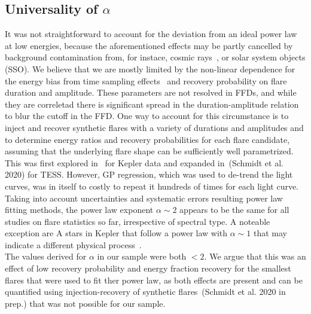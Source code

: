 \documentclass{aa}
\begin{document}
\subsection{Universality of $\alpha$}
It was not straightforward to account for the deviation from an ideal power law at low energies, because the aforementioned effects may be partly cancelled by background contamination from, for instace, cosmic rays~\citep{aschwanden_powerlaws_2015}, or solar system objects (SSO).  We believe that we are mostly limited by the non-linear dependence for the energy bias from time sampling effects~\citep{yang_flaresampling_2018} and recovery probability on flare duration and amplitude. These parameters are not resolved in FFDs, and while they are correletad there is significant spread in the duration-amplitude relation to blur the cutoff in the FFD. One way to account for this circumstance is to inject and recover synthetic flares with a variety of durations and amplitudes and to determine energy ratios and recovery probabilities for each flare candidate, assuming that the underlying flare shape can be sufficiently well parametrized. This was first explored in~\citet{davenport_kepler_2014} for Kepler data and expanded in~(Schmidt et al. 2020) for TESS. However, GP regression, which was used to de-trend the light curves, was in itself to costly to repeat it hundreds of times for each light curve. 
\\
Taking into account uncertainties and systematic errors resulting power law fitting methods, the power law exponent $\alpha\sim 2$ appears to be the same for all studies on flare statistics so far, irrespective of spectral type. A noteable exception are A stars in Kepler that follow a power law with $\alpha\sim 1$ that may indicate a different physical process~\citep{yang_keplerflares_2019}.
\\
The values derived for $\alpha$ in our sample were both $<2$. We argue that this was an effect of low recovery probability and energy fraction recovery for the smallest flares that were used to fit ther power law, as both effects are present and can be quantified using injection-recovery of synthetic flares~(Schmidt et al. 2020 in prep.) that was not possible for our sample.  
  
\end{document}
